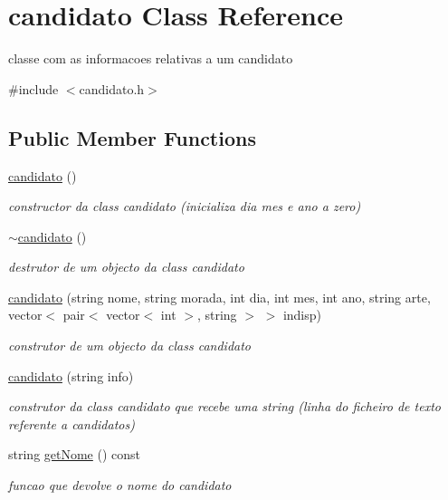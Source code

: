 \hypertarget{classcandidato}{}\section{candidato Class Reference}
\label{classcandidato}


classe com as informacoes relativas a um candidato  




{\ttfamily \#include $<$candidato.\+h$>$}

\subsection*{Public Member Functions}
\begin{DoxyCompactItemize}
\item 
\hyperlink{classcandidato_a3748841c39881c84ed68836994180930}{candidato} ()
\begin{DoxyCompactList}\small\item\em constructor da class candidato (inicializa dia mes e ano a zero) \end{DoxyCompactList}\item 
\hyperlink{classcandidato_a3b209d1da7568dbb3854fbecb6368ab8}{$\sim$candidato} ()
\begin{DoxyCompactList}\small\item\em destrutor de um objecto da class candidato \end{DoxyCompactList}\item 
\hyperlink{classcandidato_a2a4ed15dbc5e3047c5dc57324fac73d0}{candidato} (string nome, string morada, int dia, int mes, int ano, string arte, vector$<$ pair$<$ vector$<$ int $>$, string $>$ $>$ indisp)
\begin{DoxyCompactList}\small\item\em construtor de um objecto da class candidato \end{DoxyCompactList}\item 
\hyperlink{classcandidato_af7638b8776045e7015c07a848bc9991b}{candidato} (string info)
\begin{DoxyCompactList}\small\item\em construtor da class candidato que recebe uma string (linha do ficheiro de texto referente a candidatos) \end{DoxyCompactList}\item 
string \hyperlink{classcandidato_a7957f630ffa6a8ebb53d7d49a484cdb0}{get\+Nome} () const 
\begin{DoxyCompactList}\small\item\em funcao que devolve o nome do candidato \end{DoxyCompactList}\item 

\end{DoxyCompactItemize}
